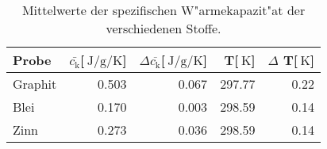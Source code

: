 
\begin{table}[!h]
\begin{center}
\begin{tabular}{|l|r|r|r|r|}
\hline
Probe & $\bar{c_\mathrm{k}}$[$\SI{}{\joule\per\gram\per\kelvin}$] & $\Delta\overline{c_\mathrm{k}}$[$\SI{}{\joule\per\gram\per\kelvin}$] & T[$\SI{}{\kelvin}$] & $\Delta$ T[$\SI{}{\kelvin}$] \\
\hline
\hline
Graphit & 0.503 & 0.067 & 297.77 & 0.22\\
Blei    & 0.170 & 0.003 & 298.59 & 0.14\\
Zinn    & 0.273 & 0.036 & 298.59 & 0.14\\
\hline
\end{tabular}
\caption[]{Mittelwerte der spezifischen W"armekapazit"at der verschiedenen Stoffe.}
\label{mittel}
\end{center}
\end{table}